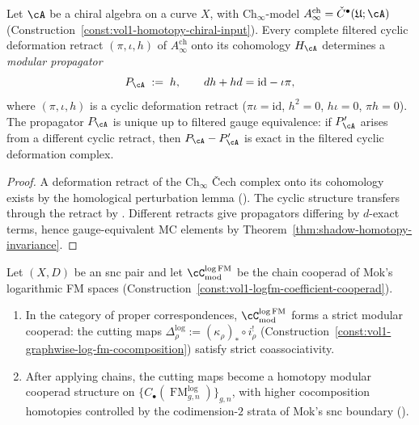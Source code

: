 \begin{theorem}
\label{thm:modular-propagator-existence}
Let $\cA$ be a chiral algebra on a curve $X$, with
$\mathrm{Ch}_\infty$-model
$A^{\mathrm{ch}}_\infty = \check{C}^\bullet(\mathfrak{U};\cA)$
\textup{(}Construction~\textup{\ref{const:vol1-homotopy-chiral-input})}.
Every complete filtered cyclic deformation retract
$(\pi, \iota, h)$ of $A^{\mathrm{ch}}_\infty$ onto its cohomology
$H_\cA$ determines a \emph{modular propagator}
\begin{equation}
\label{eq:modular-propagator}
P_\cA \;:=\; h,
\qquad dh + hd = \mathrm{id} - \iota\pi,
\end{equation}
where $(\pi, \iota, h)$ is a cyclic deformation retract
($\pi\iota = \mathrm{id}$, $h^2 = 0$, $h\iota = 0$, $\pi h = 0$).
The propagator $P_\cA$ is unique up to filtered gauge equivalence:
if $P_\cA'$ arises from a different cyclic retract, then
$P_\cA - P_\cA'$ is exact in the filtered cyclic deformation complex.
\end{theorem}

\begin{proof}
A deformation retract of the $\mathrm{Ch}_\infty$ \v{C}ech complex
onto its cohomology exists by the homological perturbation lemma
(\cite[\S10]{LV12}).
The cyclic structure transfers through the retract by
\cite{KontsevichSoibelman}.
Different retracts give propagators differing by $d$-exact terms,
hence gauge-equivalent MC elements by
Theorem~\ref{thm:shadow-homotopy-invariance}.
\end{proof}

\begin{theorem}
\label{thm:logfm-modular-cocomposition}
Let $(X,D)$ be an snc pair and let
$\cC^{\log\mathrm{FM}}_{\mathrm{mod}}$ be the chain cooperad of
Mok's logarithmic FM spaces
\textup{(}Construction~\textup{\ref{const:vol1-logfm-coefficient-cooperad})}.
\begin{enumerate}[label=\textup{(\roman*)}]
\item In the category of proper correspondences,
  $\cC^{\log\mathrm{FM}}_{\mathrm{mod}}$ forms a strict modular
  cooperad: the cutting maps
  $\Delta_\rho^{\log} := (\kappa_\rho)_* \circ i_\rho^{!}$
  \textup{(}Construction~\textup{\ref{const:vol1-graphwise-log-fm-cocomposition})}
  satisfy strict coassociativity.
\item After applying chains, the cutting maps become a homotopy
  modular cooperad structure on
  $\{C_\bullet(\operatorname{FM}_{g,n}^{\log})\}_{g,n}$,
  with higher cocomposition homotopies controlled by the
  codimension-$2$ strata of Mok's snc boundary
  \textup{(}\cite[Theorem~3.3.1]{Mok25}\textup{)}.
\end{enumerate}
\end{theorem}

